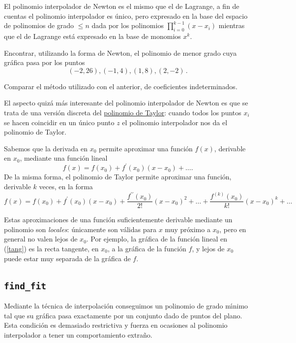 El polinomio interpolador de Newton es el mismo que el de Lagrange, a fin de
cuentas el polinomio interpolador es \'unico, pero expresado en la base del
espacio de polinomios de grado $\le n$ dada por los polinomios
$\prod_{i=0}^{k-1}(x-x_{i})$ mientras que el de Lagrange est\'a expresado en la
base de monomios $x^k$.



\begin{ejer}
 Encontrar, utilizando la forma de Newton, el polinomio de menor grado cuya
gráfica pasa por los puntos
 $$
 (-2, 26), (-1, 4), (1, 8), (2, -2)\,.
 $$
 
Comparar el método utilizado con el anterior, de coeficientes indeterminados.
\end{ejer}


El aspecto quiz\'a m\'as interesante del polinomio interpolador de Newton es que
se trata de una versi\'on discreta del \hyperref[taylor]{polinomio de Taylor}: cuando todos los
puntos $x_i$ se hacen coincidir en un \'unico punto $z$ el polinomio
interpolador nos da el polinomio de Taylor. 






Sabemos que la derivada en $x_0$ permite aproximar una funci\'on $f(x)$, 
derivable en $x_0$, mediante una funci\'on lineal 
\begin{equation}\label{tang}
f(x)=f(x_0)+f^{\prime}(x_0)(x-x_0)+\dots.
\end{equation}
De la misma forma, el polinomio de Taylor permite aproximar una funci\'on,
derivable $k$ veces, en la forma
\[f(x)=f(x_0)+f^{\prime}(x_0)(x-x_0)+\frac{f^{\prime\prime}(x_0)}{2!}
(x-x_0)^2+\dots+ \frac{f^{(k)}(x_0)}{k!}(x-x_0)^k+\dots\]

Estas aproximaciones de una funci\'on suficientemente derivable mediante un
polinomio son {\itshape locales}: \'unicamente son v\'alidas para $x$ muy
pr\'oximo a $x_0$, pero en general no valen lejos de $x_0$. Por ejemplo, la
gr\'afica de la funci\'on lineal en (\ref{tang}) es la recta tangente, en $x_0$,
 a la gr\'afica de la funci\'on $f$, y lejos de $x_0$ puede estar muy separada
de la gr\'afica de $f$.
\subsection{{\tt find\_fit}}
Mediante la t\'ecnica de interpolaci\'on conseguimos un polinomio de grado
m\'{\i}nimo tal que su gr\'afica pasa exactamente por un conjunto dado de
puntos del plano. Esta condici\'on es demasiado restrictiva y fuerza en
ocasiones al polinomio interpolador a tener un comportamiento extra\~no.


